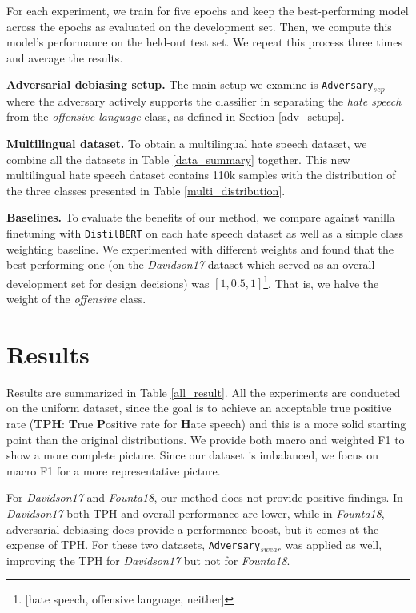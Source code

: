 \documentclass[11pt]{article}
\begin{document}
	For each experiment, we train for five epochs and keep the best-performing model across the epochs as evaluated on the development set. Then, we compute this model's performance on the held-out test set. We repeat this process three times and average the results.
	
	\textbf{Adversarial debiasing setup.} The main setup we examine is \texttt{Adversary$_{sep}$} where the adversary actively supports the classifier in separating the \textit{hate speech} from the \textit{offensive language} class, as defined in Section \ref{adv_setups}.
	
	\textbf{Multilingual dataset.} To obtain a multilingual hate speech dataset, we combine all the datasets in Table \ref{data_summary} together. This new multilingual hate speech dataset contains 110k samples with the distribution of the three classes presented in Table \ref{multi_distribution}.
	
	\textbf{Baselines.} To evaluate the benefits of our method, we compare against vanilla finetuning with \texttt{DistilBERT} on each hate speech dataset as well as a simple class weighting baseline. We experimented with different weights and found that the best performing one (on the \textit{Davidson17} dataset which served as an overall development set for design decisions) was $[1, 0.5, 1]$\footnote{[hate speech, offensive language, neither]}. That is, we halve the weight of the \textit{offensive} class.
	
	
	\section{Results}
	
	Results are summarized in Table \ref{all_result}. All the experiments are conducted on the uniform dataset, since the goal is to achieve an acceptable true positive rate (\textbf{TPH}: \textbf{T}rue \textbf{P}ositive rate for \textbf{H}ate speech) and this is a more solid starting point than the original distributions. We provide both macro and weighted F1 to show a more complete picture. Since our dataset is imbalanced, we focus on macro F1 for a more representative picture.
	
	For \textit{Davidson17} and \textit{Founta18}, our method does not provide positive findings. In \textit{Davidson17} both TPH and overall performance are lower, while in \textit{Founta18}, adversarial debiasing does provide a performance boost, but it comes at the expense of TPH. For these two datasets, \texttt{Adversary$_{swear}$} was applied as well, improving the TPH for \textit{Davidson17} but not for \textit{Founta18}.
	
\end{document}
